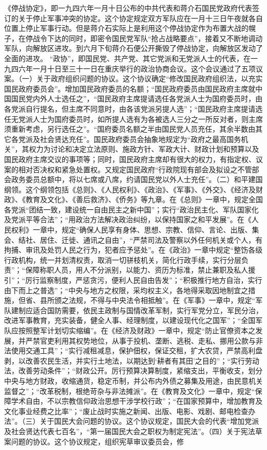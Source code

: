 \begin{maonote}
《停战协定》，即一九四六年一月十日公布的中共代表和蒋介石国民党政府代表签订的关于停止军事冲突的协定。这个协定规定双方军队应在一月十三日午夜就各自位置上停止军事行动。但是蒋介石实际上是利用这个停战协定作为布置大战的幌子，在停战令下达的同时，即密令国民党军队“抢占战略要点”，接着又不断地调动军队，向解放区进攻。到六月下旬蒋介石便公开撕毁了停战协定，向解放区发动了全面的进攻。
“政协”，即国民党、共产党、其它党派和无党派人士的代表，在一九四六年一月十日至三十一日在重庆举行的政治协商会议。这个会议通过了五项议案。（一）关于政府组织问题的协议。这个协议确定“修改国民政府组织法，以充实国民政府委员会”。增加国民政府委员的名额；“国民政府委员由国民政府主席就中国国民党内外人士选任之”，“国民政府主席提请选任各党派人士为国府委员时，由各党派自行提名，但主席不同意时，由各该党派另提人选”；“国民政府主席提请选任无党派人士为国府委员时，如所提人选有为各被选人三分之一所反对者，则主席须重新考虑，另行选任之”。“国府委员名额之半由国民党人员充任，其余半数由其它各党派及社会贤达充任”。国民政府委员会抽象地规定为“政府之最高国务机关”，其权力为讨论和决定立法原则、施政方针、军政大计、财政计划和预算以及国民政府主席交议的事项等；同时，国民政府主席却有很大的权力，有指定权、议案的相对否决权和紧急处置权。又规定国民政府“行政院现有部会及拟设之不管部会政务委员总额中，将以七席或八席，约请国民党以外人士充任”。（二）和平建国纲领。这个纲领包括《总则》、《人民权利》、《政治》、《军事》、《外交》、《经济及财政》、《教育及文化》、《善后救济》、《侨务》等九章。在《总则》一章中，规定全国各党派“团结一致，建设统一自由民主之新中国”；实行“政治民主化、军队国家化及党派平等合法”；“用政治方法解决政治纠纷，以保持国家之和平发展”。在《人民权利》一章中，规定“确保人民享有身体、思想、宗教、信仰、言论、出版、集会、结社、居住、迁徙、通讯之自由”，“严禁司法及警察以外任何机关或个人，有拘捕、审讯及处罚人民之行为，犯者应予惩处”。在《政治》一章中规定“整饬各级行政机构，统一并划清权责，取消一切骈枝机关，简化行政手续，实行分层负责”；“保障称职人员，用人不分派别，以能力、资历为标准，禁止兼职及私人援引”；“厉行监察制度，严惩贪污，便利人民自由告发”；“积极推行地方自治，实行由下而上之普选”；“中央与地方之权限，采均权主义，各地得采取因地制宜之措施，但省、县所颁之法规，不得与中央法令相抵触”。在《军事》一章中，规定“军队建制应适合国防需要，依民主政制与国情改革军制，实行军党分立，军民分治，改进军事教育，充实装备，健全人事、经理制度，以建设现代化之国军”；“全国军队应按照整军计划切实缩编”。在《经济及财政》一章中，规定“防止官僚资本之发展，并严禁官吏利用其权势地位，从事于投机、垄断、逃税、走私、挪用公款与非法使用交通工具”；“实行减租减息，保护佃权，保证交租，扩大农贷，严禁高利盘剥，以改善农民生活，并实行土地法，以期达到‘耕者有其田’之目的”；“实行劳动法，改善劳动条件”；“财政公开。厉行预算决算制度，紧缩支出，平衡收支，划分中央与地方财政，收缩通货，稳定币制，并公布内外债之募集及用途，由民意机关监督之”；“改革税制，根绝苛杂与非法摊派”。在《教育及文化》一章中，规定“保障学术自由，不以宗教信仰政治思想干涉学校行政”；“在国家预算中，增加教育及文化事业经费之比率”；“废止战时实施之新闻、出版、电影、戏剧、邮电检查办法”。（三）关于国民大会问题的协议。这个协议规定，国民大会的代表“增加党派及社会贤达代表七百名”，“第一届国民大会之职权为制定宪法”。（四）关于宪法草案问题的协议。这个协议规定，组织宪草审议委员会，修
\end{maonote}

